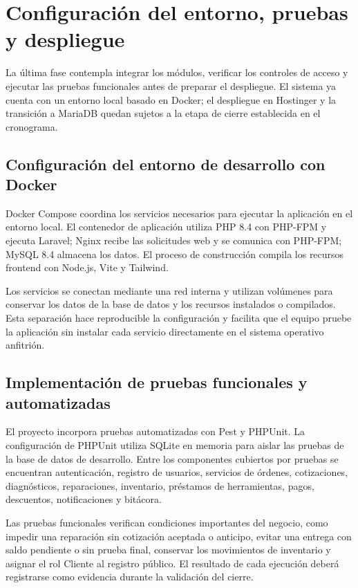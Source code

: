 \section{Configuración del entorno, pruebas y despliegue}

La última fase contempla integrar los módulos, verificar los controles de acceso y ejecutar las pruebas funcionales antes de preparar el despliegue. El sistema ya cuenta con un entorno local basado en Docker; el despliegue en Hostinger y la transición a MariaDB quedan sujetos a la etapa de cierre establecida en el cronograma.

\subsection{Configuración del entorno de desarrollo con Docker}

Docker Compose coordina los servicios necesarios para ejecutar la aplicación en el entorno local. El contenedor de aplicación utiliza PHP 8.4 con PHP-FPM y ejecuta Laravel; Nginx recibe las solicitudes web y se comunica con PHP-FPM; MySQL 8.4 almacena los datos. El proceso de construcción compila los recursos frontend con Node.js, Vite y Tailwind.

Los servicios se conectan mediante una red interna y utilizan volúmenes para conservar los datos de la base de datos y los recursos instalados o compilados. Esta separación hace reproducible la configuración y facilita que el equipo pruebe la aplicación sin instalar cada servicio directamente en el sistema operativo anfitrión.

\subsection{Implementación de pruebas funcionales y automatizadas}

El proyecto incorpora pruebas automatizadas con Pest y PHPUnit. La configuración de PHPUnit utiliza SQLite en memoria para aislar las pruebas de la base de datos de desarrollo. Entre los componentes cubiertos por pruebas se encuentran autenticación, registro de usuarios, servicios de órdenes, cotizaciones, diagnósticos, reparaciones, inventario, préstamos de herramientas, pagos, descuentos, notificaciones y bitácora.

Las pruebas funcionales verifican condiciones importantes del negocio, como impedir una reparación sin cotización aceptada o anticipo, evitar una entrega con saldo pendiente o sin prueba final, conservar los movimientos de inventario y asignar el rol Cliente al registro público. El resultado de cada ejecución deberá registrarse como evidencia durante la validación del cierre.


